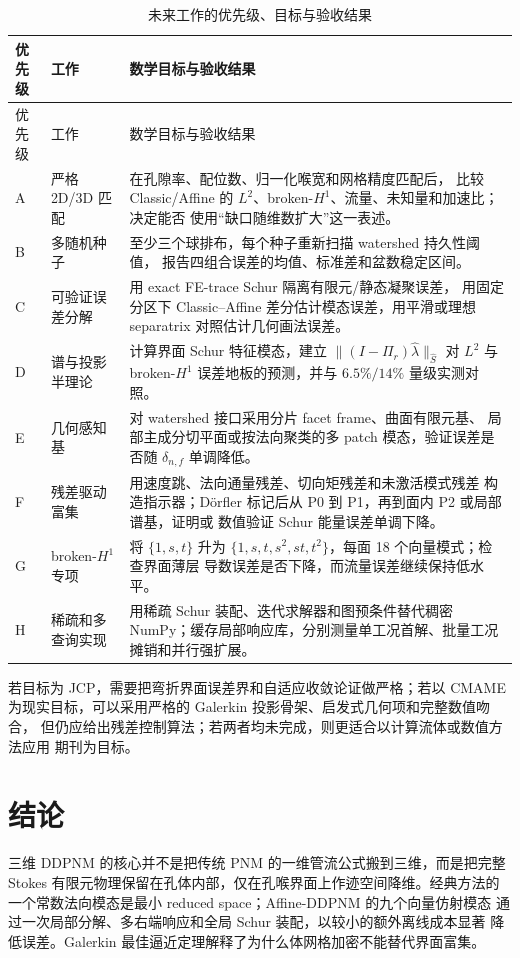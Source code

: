 \documentclass[UTF8,zihao=-4]{ctexart}
\newcommand{\proj}{\Pi}
\begin{document}
\begin{longtable}{p{1.0cm}p{3.3cm}p{8.5cm}}
\caption{未来工作的优先级、目标与验收结果}\label{tab:future}\\
\toprule
优先级 & 工作 & 数学目标与验收结果\\
\midrule
\endfirsthead
\toprule
优先级 & 工作 & 数学目标与验收结果\\
\midrule
\endhead
A & 严格 2D/3D 匹配 & 在孔隙率、配位数、归一化喉宽和网格精度匹配后，
比较 Classic/Affine 的 $L^2$、broken-$H^1$、流量、未知量和加速比；决定能否
使用``缺口随维数扩大''这一表述。\\
B & 多随机种子 & 至少三个球排布，每个种子重新扫描 watershed 持久性阈值，
报告四组合误差的均值、标准差和盆数稳定区间。\\
C & 可验证误差分解 & 用 exact FE-trace Schur 隔离有限元/静态凝聚误差，
用固定分区下 Classic--Affine 差分估计模态误差，用平滑或理想 separatrix
对照估计几何画法误差。\\
D & 谱与投影半理论 & 计算界面 Schur 特征模态，建立
$\|(I-\proj_r)\widehat\lambda\|_{\widehat S}$ 对 $L^2$ 与 broken-$H^1$
误差地板的预测，并与 $6.5\%/14\%$ 量级实测对照。\\
E & 几何感知基 & 对 watershed 接口采用分片 facet frame、曲面有限元基、
局部主成分切平面或按法向聚类的多 patch 模态，验证误差是否随
$\delta_{n,f}$ 单调降低。\\
F & 残差驱动富集 & 用速度跳、法向通量残差、切向矩残差和未激活模式残差
构造指示器；D\"orfler 标记后从 P0 到 P1，再到面内 P2 或局部谱基，证明或
数值验证 Schur 能量误差单调下降。\\
G & broken-$H^1$ 专项 & 将
$\{1,s,t\}$ 升为 $\{1,s,t,s^2,st,t^2\}$，每面 18 个向量模式；检查界面薄层
导数误差是否下降，而流量误差继续保持低水平。\\
H & 稀疏和多查询实现 & 用稀疏 Schur 装配、迭代求解器和图预条件替代稠密
NumPy；缓存局部响应库，分别测量单工况首解、批量工况摊销和并行强扩展。\\
\bottomrule
\end{longtable}

若目标为 JCP，需要把弯折界面误差界和自适应收敛论证做严格；若以 CMAME
为现实目标，可以采用严格的 Galerkin 投影骨架、启发式几何项和完整数值吻合，
但仍应给出残差控制算法；若两者均未完成，则更适合以计算流体或数值方法应用
期刊为目标。

\section{结论}

三维 DDPNM 的核心并不是把传统 PNM 的一维管流公式搬到三维，而是把完整
Stokes 有限元物理保留在孔体内部，仅在孔喉界面上作迹空间降维。经典方法的
一个常数法向模态是最小 reduced space；Affine-DDPNM 的九个向量仿射模态
通过一次局部分解、多右端响应和全局 Schur 装配，以较小的额外离线成本显著
降低误差。Galerkin 最佳逼近定理解释了为什么体网格加密不能替代界面富集。
\end{document}
